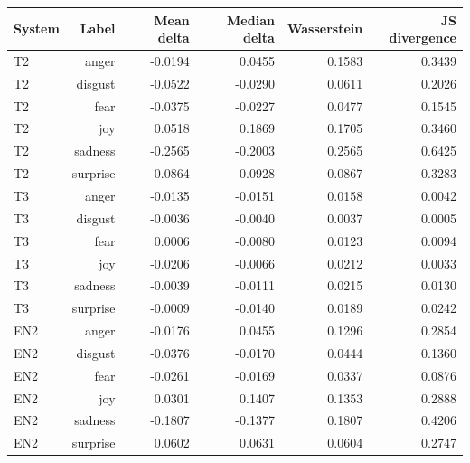 \begin{tabular}{lrrrrr}
\toprule
System & Label & Mean delta & Median delta & Wasserstein & JS divergence \\
\midrule
T2 & anger & -0.0194 & 0.0455 & 0.1583 & 0.3439 \\
T2 & disgust & -0.0522 & -0.0290 & 0.0611 & 0.2026 \\
T2 & fear & -0.0375 & -0.0227 & 0.0477 & 0.1545 \\
T2 & joy & 0.0518 & 0.1869 & 0.1705 & 0.3460 \\
T2 & sadness & -0.2565 & -0.2003 & 0.2565 & 0.6425 \\
T2 & surprise & 0.0864 & 0.0928 & 0.0867 & 0.3283 \\
T3 & anger & -0.0135 & -0.0151 & 0.0158 & 0.0042 \\
T3 & disgust & -0.0036 & -0.0040 & 0.0037 & 0.0005 \\
T3 & fear & 0.0006 & -0.0080 & 0.0123 & 0.0094 \\
T3 & joy & -0.0206 & -0.0066 & 0.0212 & 0.0033 \\
T3 & sadness & -0.0039 & -0.0111 & 0.0215 & 0.0130 \\
T3 & surprise & -0.0009 & -0.0140 & 0.0189 & 0.0242 \\
EN2 & anger & -0.0176 & 0.0455 & 0.1296 & 0.2854 \\
EN2 & disgust & -0.0376 & -0.0170 & 0.0444 & 0.1360 \\
EN2 & fear & -0.0261 & -0.0169 & 0.0337 & 0.0876 \\
EN2 & joy & 0.0301 & 0.1407 & 0.1353 & 0.2888 \\
EN2 & sadness & -0.1807 & -0.1377 & 0.1807 & 0.4206 \\
EN2 & surprise & 0.0602 & 0.0631 & 0.0604 & 0.2747 \\
\bottomrule
\end{tabular}
